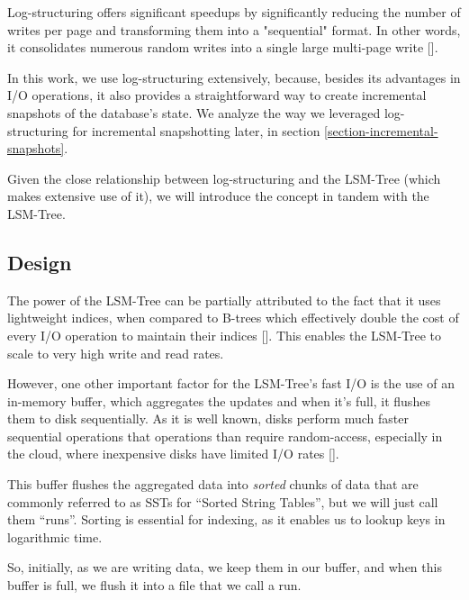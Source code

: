 Log-structuring offers significant speedups by significantly reducing the number of writes per page and transforming them into a "sequential" format.
In other words, it consolidates numerous random writes into a single large multi-page write [\cite{llama}].

In this work, we use log-structuring extensively, because, besides its advantages in I/O operations, it also provides a straightforward way to create incremental snapshots of the database's state.
We analyze the way we leveraged log-structuring for incremental snapshotting later, in section \ref{section-incremental-snapshots}.

Given the close relationship between log-structuring and the LSM-Tree (which makes extensive use of it), we will introduce the concept in tandem with the LSM-Tree.

\subsection{Design}
\label{subsection-lsm-design}

The power of the LSM-Tree can be partially attributed to the fact that it uses lightweight indices, when compared to B-trees which effectively double the cost of every I/O operation to maintain their indices [\cite{lsmtree}].
This enables the LSM-Tree to scale to very high write and read rates.

However, one other important factor for the LSM-Tree's fast I/O is the use of an in-memory buffer, which aggregates the updates and when it's full, it flushes them to disk sequentially.
As it is well known, disks perform much faster sequential operations that operations than require random-access, especially in the cloud, where inexpensive disks have limited I/O rates [\cite{llama}].

This buffer flushes the aggregated data into \textit{sorted} chunks of data that are commonly referred to as SSTs for ``Sorted String Tables'', but we will just call them ``runs''.
Sorting is essential for indexing, as it enables us to lookup keys in logarithmic time.

So, initially, as we are writing data, we keep them in our buffer, and when this buffer is full, we flush it into a file that we call a run.





